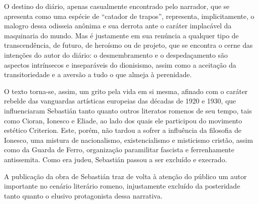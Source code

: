 O destino do diário, apenas casualmente encontrado pelo narrador, que se
apresenta como uma espécie de ``catador de trapos'', representa,
implicitamente, o malogro dessa odisseia anônima e sua derrota ante o
caráter implacável da maquinaria do mundo. Mas é justamente em sua
renúncia a qualquer tipo de transcendência, de futuro, de heroísmo ou de
projeto, que se encontra o cerne das intenções do autor do diário: o
desmembramento e o despedaçamento são aspectos intrínsecos e
inseparáveis do dionisismo, assim como a aceitação da transitoriedade e
a aversão a tudo o que almeja à perenidade.

O texto torna-se, assim, um grito pela vida em si mesma, afinado com o
caráter rebelde das vanguardas artísticas europeias das décadas de 1920
e 1930, que influenciaram Sebastián tanto quanto outros literatos
romenos de seu tempo, tais como Cioran, Ionesco e Eliade, ao lado dos
quais ele participou do movimento estético Criterion. Este, porém, não
tardou a sofrer a influência da filosofia de Ionesco, uma mistura de
nacionalismo, existencialismo e misticismo cristão, assim como da Guarda
de Ferro, organização paramilitar fascista e ferrenhamente antissemita.
Como era judeu, Sebastián passou a ser excluído e execrado.

A publicação da obra de Sebastián traz de volta à atenção do público um
autor importante no cenário literário romeno, injustamente excluído da
posteridade tanto quanto o elusivo protagonista dessa narrativa. 

